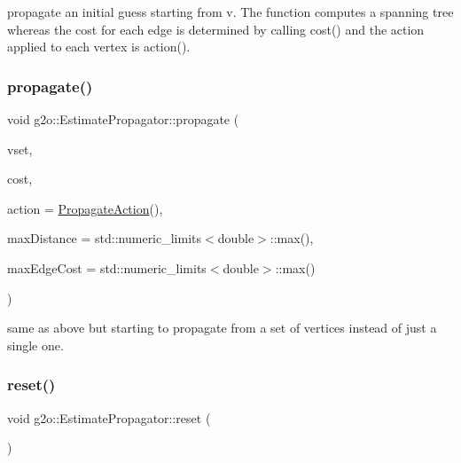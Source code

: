 propagate an initial guess starting from v. The function computes a spanning tree whereas the cost for each edge is determined by calling cost() and the action applied to each vertex is action(). \mbox{\label{classg2o_1_1_estimate_propagator_ae24b104ec3e8162bc75a70db9941f342}} 
\subsubsection{\texorpdfstring{propagate()}{propagate()}\hspace{0.1cm}{\footnotesize\ttfamily [2/2]}}
{\footnotesize\ttfamily void g2o\+::\+Estimate\+Propagator\+::propagate (\begin{DoxyParamCaption}\item[{\mbox{\hyperlink{classg2o_1_1_hyper_graph_a703938cdb4bb636860eed55a2489d70c}{Optimizable\+Graph\+::\+Vertex\+Set}} \&}]{vset,  }\item[{const \mbox{\hyperlink{classg2o_1_1_estimate_propagator_a67a42f9c6d5f92562ac4ea12f81c8d9c}{Estimate\+Propagator\+::\+Propagate\+Cost}} \&}]{cost,  }\item[{const \mbox{\hyperlink{structg2o_1_1_estimate_propagator_1_1_propagate_action}{Estimate\+Propagator\+::\+Propagate\+Action}} \&}]{action = {\ttfamily \mbox{\hyperlink{structg2o_1_1_estimate_propagator_1_1_propagate_action}{Propagate\+Action}}()},  }\item[{double}]{max\+Distance = {\ttfamily std\+:\+:numeric\+\_\+limits$<$double$>$\+:\+:max()},  }\item[{double}]{max\+Edge\+Cost = {\ttfamily std\+:\+:numeric\+\_\+limits$<$double$>$\+:\+:max()} }\end{DoxyParamCaption})}

same as above but starting to propagate from a set of vertices instead of just a single one. \mbox{\label{classg2o_1_1_estimate_propagator_a8319099eda0552b9ef62a0bb40bb0785}} 
\subsubsection{\texorpdfstring{reset()}{reset()}}
{\footnotesize\ttfamily void g2o\+::\+Estimate\+Propagator\+::reset (\begin{DoxyParamCaption}{ }\end{DoxyParamCaption})\hspace{0.3cm}{\ttfamily [protected]}}

